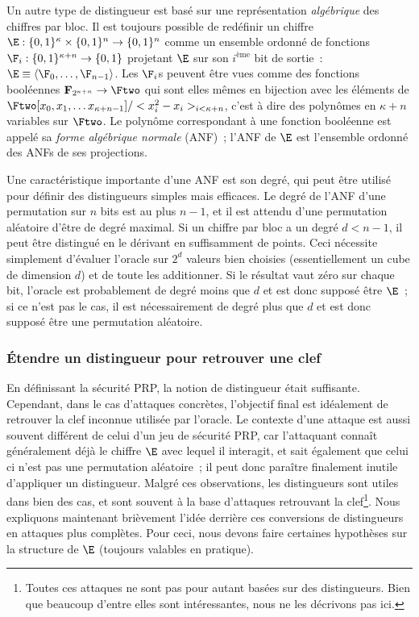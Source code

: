 \bigskip

Un autre type de distingueur est basé sur une représentation \emph{algébrique} des chiffres par bloc.
Il est toujours possible de redéfinir un chiffre 
$\E : \{0,1\}^\kappa \times \{0,1\}^n \rightarrow \{0,1\}^n$ comme un ensemble ordonné de fonctions $\F_i : \{0,1\}^{\kappa+n} \rightarrow \{0,1\}$ projetant
$\E$ sur son $i^\text{ème}$ bit de sortie~: $\E \equiv \langle \F_0, \ldots, \F_{n-1} \rangle$. Les $\F_i$s peuvent être vues comme des fonctions booléennes
$\mathbf{F}_{2^{\kappa + n}} \rightarrow \Ftwo$ qui sont elles mêmes en bijection avec les éléments de $\Ftwo[x_0,x_1,\ldots x_{\kappa + n-1}]/<x_i^2-x_i>_{i<\kappa + n}$,
c'est à dire des polynômes en $\kappa + n$ variables sur $\Ftwo$. Le polynôme correspondant à une fonction booléenne est appelé sa \emph{forme algébrique normale}
(ANF)~;
l'ANF de $\E$ est l'ensemble ordonné des ANFs de ses projections.

Une caractéristique importante d'une ANF est son degré, qui peut être utilisé pour définir des distingueurs simples mais efficaces.
Le degré de l'ANF d'une permutation sur $n$ bits est au plus $n - 1$, et il est attendu d'une permutation aléatoire d'être de degré
maximal. Si un chiffre par bloc a un degré $d < n - 1$, il peut être distingué en le dérivant en suffisamment de points.
Ceci nécessite simplement d'évaluer l'oracle sur $2^d$ valeurs bien choisies (essentiellement un cube de dimension $d$) et de toute les additionner.
Si le résultat vaut zéro sur chaque bit, l'oracle est probablement de degré moins que $d$ et est donc supposé être $\E$~; si ce n'est pas le cas, il est
nécessairement de degré plus que $d$ et est donc supposé être une permutation aléatoire.

\subsubsection{\'Etendre un distingueur pour retrouver une clef}

En définissant la sécurité PRP, la notion de distingueur était suffisante. Cependant, dans le cas d'attaques concrètes, l'objectif
final est idéalement de retrouver la clef inconnue utilisée par l'oracle.
Le contexte d'une attaque est aussi souvent différent de celui d'un jeu de sécurité PRP, car l'attaquant connaît généralement déjà
le chiffre $\E$ avec lequel il interagit, et sait également que celui ci n'est pas une permutation aléatoire~; il peut donc paraître finalement inutile
d'appliquer un distingueur.
Malgré ces observations, les distingueurs sont utiles dans bien des cas, et sont souvent à la base d'attaques retrouvant la clef\footnote{Toutes ces
attaques ne sont pas pour autant basées sur des distingueurs. Bien que beaucoup d'entre elles sont intéressantes, nous ne les décrivons pas ici.}.
Nous expliquons maintenant brièvement l'idée derrière ces conversions de distingueurs en attaques plus complètes. Pour ceci, nous devons faire
certaines hypothèses sur la structure de $\E$ (toujours valables en pratique).

